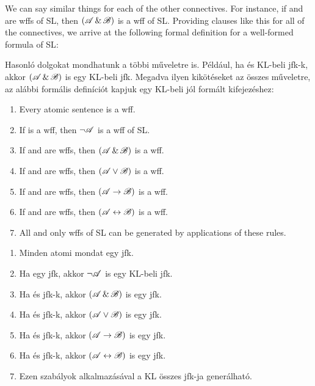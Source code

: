 

We can say similar things for each of the other connectives. For instance, if  and  are wffs of SL, then $(\mathscr{A}\,\&\,\mathscr{B})$ is a wff of SL. Providing clauses like this for all of the connectives, we arrive at the following formal definition for a {well-formed formula of SL}:

Hasonló dolgokat mondhatunk a többi műveletre is. Például, ha  és  KL-beli jfk-k, akkor $(\mathscr{A}\,\&\,\mathscr{B})$ is egy KL-beli jfk. Megadva ilyen kikötéseket az összes műveletre, az alábbi formális definíciót kapjuk egy {KL-beli jól formált kifejezéshez}:

\begin{enumerate}
\item Every atomic sentence is a wff.
\item If  is a wff, then $\neg\mathscr{A}$ is a wff of SL.
\item If  and  are wffs, then $(\mathscr{A}\,\&\,\mathscr{B})$ is a wff.
\item If  and  are wffs, then $(\mathscr{A}\vee\mathscr{B})$ is a wff.
\item If  and  are wffs, then $(\mathscr{A}\rightarrow\mathscr{B})$ is a wff.
\item If  and  are wffs, then $(\mathscr{A}\leftrightarrow\mathscr{B})$ is a wff.
\item All and only wffs of SL can be generated by applications of these rules.
\end{enumerate}

\begin{enumerate}
\item Minden atomi mondat egy jfk.
\item Ha  egy jfk, akkor $\neg\mathscr{A}$ is egy KL-beli jfk.
\item Ha  és  jfk-k, akkor $(\mathscr{A}\,\&\,\mathscr{B})$ is egy jfk.
\item Ha  és  jfk-k, akkor $(\mathscr{A}\vee\mathscr{B})$ is egy jfk.
\item Ha  és  jfk-k, akkor $(\mathscr{A}\rightarrow\mathscr{B})$ is egy jfk.
\item Ha  és  jfk-k, akkor $(\mathscr{A}\leftrightarrow\mathscr{B})$ is egy jfk.
\item Ezen szabályok alkalmazásával a KL összes jfk-ja generálható.
\end{enumerate}

